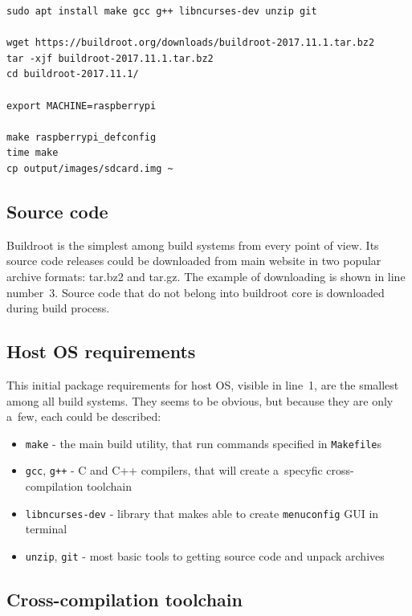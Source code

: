 \documentclass[printmode]{mgr}
\begin{document}

\begin{lstlisting}
sudo apt install make gcc g++ libncurses-dev unzip git 

wget https://buildroot.org/downloads/buildroot-2017.11.1.tar.bz2
tar -xjf buildroot-2017.11.1.tar.bz2
cd buildroot-2017.11.1/

export MACHINE=raspberrypi

make raspberrypi_defconfig
time make
cp output/images/sdcard.img ~
\end{lstlisting}



\subsection*{Source code}

Buildroot is the simplest among build systems from every point of view.
Its source code releases could be downloaded from main website in two popular archive formats: tar.bz2 and tar.gz.
The example of downloading is shown in line number~3.
Source code that do not belong into buildroot core is downloaded during build process.

\subsection*{Host OS requirements}

This initial package requirements for host OS, visible in line~1, are the smallest among all build systems.
They seems to be obvious, but because they are only a~few, each could be described:

\begin{itemize}
    \item \verb|make| - the main build utility, that run commands specified in \verb|Makefile|s
    \item \verb|gcc|, \verb|g++| - C and C++ compilers, that will create a~specyfic cross-compilation toolchain
    \item \verb|libncurses-dev| - library that makes able to create \verb|menuconfig| GUI in terminal
    \item \verb|unzip|, \verb|git| - most basic tools to getting source code and unpack archives
\end{itemize}

\subsection*{Cross-compilation toolchain}
\end{document}
